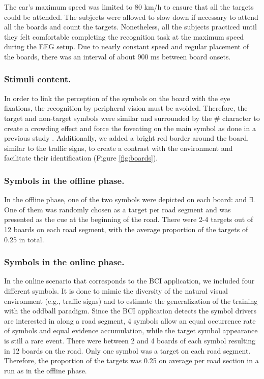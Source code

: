 \documentclass[12pt]{iopart}
\begin{document}
The car's maximum speed was limited to 80 km/h to ensure 
that all the targets
could be attended. The subjects were allowed to slow down if necessary
to attend all the boards and count the targets.
Nonetheless, all the subjects practiced until they felt comfortable 
completing the recognition task at the maximum speed
during the EEG setup.
Due to nearly constant speed and regular placement of the boards,
there was an interval of about 900 ms between board onsets.

\subsubsection{Stimuli content.} In order to link the perception of the symbols on the board
with the eye fixations, the recognition by
peripheral vision must be avoided. Therefore, the target and non-target
symbols were similar and surrounded by the \# character to create
a crowding effect and force the foveating on the main symbol
as done in a previous study \cite{kamienkowski_fixation-related_2012}.
Additionally, we added a bright red border around the board, similar 
to the traffic signs,
to create a contrast with the environment and facilitate
their identification (Figure \ref{fig:boards}).

\subsubsection*{Symbols in the offline phase.}
In the offline phase, one of the two symbols were depicted on each board:
  and $\exists$.
One of them was randomly chosen as a target per road segment
and was presented as the cue
at the beginning of the road. There were 2-4 targets out of 12 boards
on each road segment, with the average proportion of the targets of 0.25 in total.

\subsubsection*{Symbols in the online phase.}
In the online scenario that corresponds to the BCI application, we included four different symbols. It is done to mimic the diversity of the natural visual environment (e.g., traffic signs) and to estimate the generalization of the training with the oddball paradigm. Since the BCI application detects the symbol drivers are interested in along a road segment, 4 symbols allow an equal occurrence rate of symbols and equal evidence accumulation, while the target symbol appearance is still a rare event. 
There were between 2 and 4 boards of each symbol resulting in 12 boards on the road.
Only one symbol was a target on each road segment. Therefore, the proportion
of the targets was 0.25 on average per road section in a run as in the offline phase.
\end{document}
